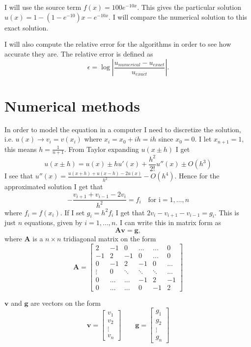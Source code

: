 \documentclass[12pt]{article}
\begin{document}
I will use the source term $f(x)=100e^{-10x}$. This gives the particular solution 
$u(x)=1-(1-e^{-10})x-e^{-10x}$. I will compare the numerical solution to this exact solution.

I will also compute the relative error for the algorithms in order to see how accurate they are. The relative error is defined as 
$$ \epsilon=\log{\left|\frac{u_{numerical}-u_{exact}}{u_{exact}}\right|}.$$

\section{Numerical methods}
In order to model the equation in a computer I need to
discretize the solution, i.e.  $ u(x) \rightarrow v_i=v(x_i) $ where
 $x_i=x_0+ih=ih$ since $x_0=0$. I let $x_{n+1}=1$, this means $h=\frac{1}{n+1}$.
 From Taylor expanding $u(x\pm h)$ I get 
 $$u(x\pm h)=u(x)\pm hu'(x)+\frac{h^2}{2!}u''(x)\pm O(h^3)$$
I see that $u''(x)=\frac{u(x+h)+u(x-h)-2u(x)}{h^2}-O(h^4)$. Hence for the approximated solution
 I get that $$-\frac{v_{i+1}+v_{i-1}-2v_i}{h^2}=f_i\quad \text{for i}=1,...,n$$ where $f_i=f(x_i)$. 
 If I set $g_i=h^2f_i$ I get that $2v_i-v_{i+1}-v_{i-1}=g_i$. 
 This is just $n$ equations, given by $i=1,...,n$. I can write this in matrix form as
 $$\mathbf{A}\mathbf{v}=\mathbf{g}, $$ where $\mathbf{A}$ is a $n\times n$ 
 tridiagonal matrix on the form 
 \begin{equation}
   \label{eq:matrix}
  \mathbf{A}=\begin{bmatrix}
    2 & -1 & 0 & \dots & ... & 0 \\
    -1 & 2 & -1 & 0 & ... & 0 \\
    0  & -1 & 2 & -1 & 0 & ... \\
    \vdots & 0 & \ddots & \ddots & \ddots & ...\\
    0 & ... & ... & -1 & 2 & -1\\
    0 & ... & ... & 0 & -1 & 2 
  \end{bmatrix}
\end{equation}

 $\mathbf{v}$ and $\mathbf{g}$ are vectors on the form 
 $$\mathbf{v}=\begin{bmatrix}
   v_1\\v_2\\\vdots\\v_n
 \end{bmatrix}
 \qquad
 \mathbf{g}=\begin{bmatrix}
   g_1\\g_2\\\vdots\\g_n
 \end{bmatrix}
 $$
\end{document}
